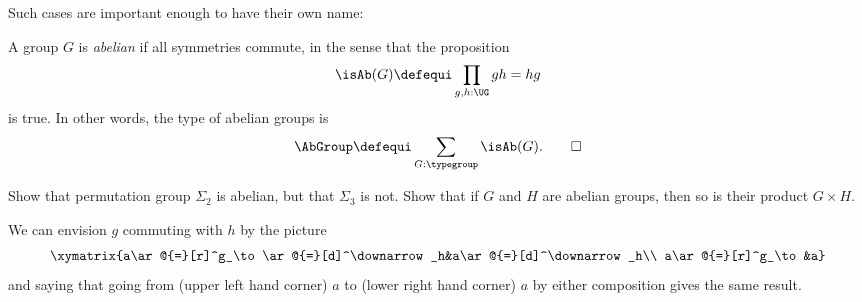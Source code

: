  Such cases are important enough to have their own name:
\begin{definition}\label{def:abgp}
  A group $G$ is \emph{abelian} if all symmetries commute, in the sense that
  the proposition
  \[
    \isAb(G)\defequi\prod_{g,h: \UG}gh=hg
  \]
  is true.  In other words, the type of abelian groups is
  \[
    \AbGroup \defequi \sum_{G:\typegroup}\isAb(G).\qedhere
  \]
\end{definition}
\begin{xca}\label{exer:first examples}
  Show that permutation group $\Sigma_2$ is abelian, but that $\Sigma_3$ is not.  Show that if $G$ and $H$ are abelian groups, then so is their product $G\times H$.
\end{xca}
We can envision $g$ commuting with $h$ by the picture
$$\xymatrix{a\ar@{=}[r]^g_\to\ar@{=}[d]^\downarrow_h&a\ar@{=}[d]^\downarrow_h\\
a\ar@{=}[r]^g_\to&a}$$
and saying that going from (upper left hand corner) $a$ to (lower right hand corner) $a$ by either composition gives the same result.

